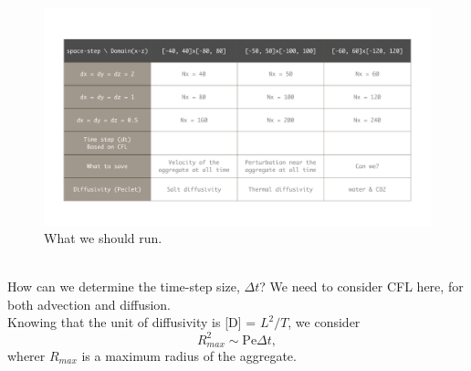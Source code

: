 %
	
\clearpage
[Updated on 01/26/2023]
%
\begin{figure}[h]
	\begin{center}
		\vspace{0.5cm}
		\includegraphics[scale=0.25]{./figures/table_agg_MERCED}	
	\caption{What we should run.}
	\label{fig_map_MERCED}
\end{center}
\end{figure}
\\
How can we determine the time-step size, $\Delta t$? We need to consider CFL here, for both advection and diffusion. 
\\
Knowing that the unit of diffusivity is [D] = $L^2/T$, we consider 
\[
R_{max}^2 \sim \text{Pe} \Delta t,
\]
wherer $R_{max}$ is a maximum radius of the aggregate. 

\clearpage
